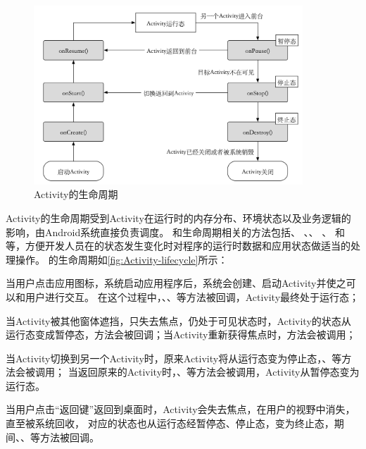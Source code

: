 \begin{figure}[!ht]
	\centering
	\includegraphics[width=0.9\textwidth]{./Figures/Activity-lifecycle-Landscape.png}
	
	\caption{Activity的生命周期}
	\label{fig:Activity-lifecycle}
\end{figure}

Activity的生命周期受到Activity在运行时的内存分布、环境状态以及业务逻辑的影响，由Android系统直接负责调度。
和生命周期相关的方法包括、 、、 、 和等，方便开发人员在的状态发生变化时对程序的运行时数据和应用状态做适当的处理操作。
的生命周期如\autoref{fig:Activity-lifecycle}所示：



当用户点击应用图标，系统启动应用程序后，系统会创建、启动Activity并使之可以和用户进行交互。
在这个过程中，、、等方法被回调，Activity最终处于运行态；


当Activity被其他窗体遮挡，只失去焦点，仍处于可见状态时，Activity的状态从运行态变成暂停态，方法会被回调；当Activity重新获得焦点时，方法会被调用；

当Activity切换到另一个Activity时，原来Activity将从运行态变为停止态，、等方法会被调用；
当返回原来的Activity时，、等方法会被调用，Activity从暂停态变为运行态。

当用户点击“返回键”返回到桌面时，Activity会失去焦点，在用户的视野中消失，直至被系统回收，
对应的状态也从运行态经暂停态、停止态，变为终止态，期间、、等方法被回调。

